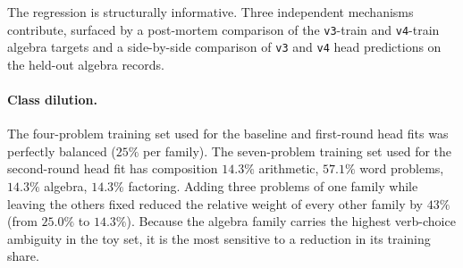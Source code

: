 The regression is structurally informative. Three independent
mechanisms contribute, surfaced by a post-mortem comparison of the
\texttt{v3}-train and \texttt{v4}-train algebra targets and a
side-by-side comparison of \texttt{v3} and \texttt{v4} head predictions
on the held-out algebra records.

\paragraph{Class dilution.} The four-problem training set used for the
baseline and first-round head fits was perfectly balanced ($25\%$ per
family). The seven-problem training set used for the second-round head
fit has composition $14.3\%$ arithmetic, $57.1\%$ word problems,
$14.3\%$ algebra, $14.3\%$ factoring. Adding three problems of one
family while leaving the others fixed reduced the relative weight of
every other family by $43\%$ (from $25.0\%$ to $14.3\%$). Because the
algebra family carries the highest verb-choice ambiguity in the toy
set, it is the most sensitive to a reduction in its training share.

